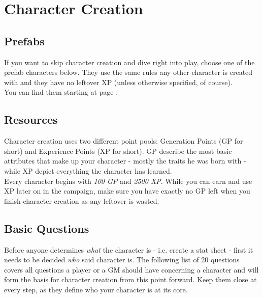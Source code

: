 \documentclass[12pt,a4paper,openany,usenames,dvipsnames]{book}
\begin{document}
	\chapter{Character Creation}
	\section{Prefabs}
	If you want to skip character creation and dive right into play, choose one of the prefab characters below.
	They use the same rules any other character is created with
		and they have no leftover XP (unless otherwise specified, of course).
	\\
	You can find them starting at page \pageref{sec:pfchars}.

	\section{Resources}
	\label{sec:ccResources}
	Character creation uses two different point pools:
		Generation Points (GP for short) and Experience Points (XP for short).
	GP describe the most basic attributes that make up your character - mostly the traits he was born with - while XP depict everything the character has learned.\\
	Every character begins with \emph{100 GP} and \emph{2500 XP}. While you can earn and use XP later on in the campaign, make sure you have exactly no GP left when you finish character creation as any leftover is wasted.

	\section{Basic Questions}
	Before anyone determines \emph{what} the character is - i.e. create a stat sheet - first it needs to be decided \emph{who} said character is. The following list of 20 questions covers all questions a player or a GM should have concerning a character and will form the basis for character creation from this point forward. Keep them close at every step, as they define who your character is at its core.

	\pagebreak
\end{document}
